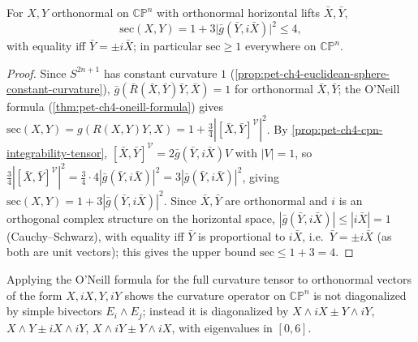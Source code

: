 \begin{theorem}
  \label{thm:pet-ch4-cpn-sectional-curvature}
  For $X,Y$ orthonormal on $\mathbb{CP}^n$ with orthonormal horizontal lifts
  $\bar X,\bar Y$,
  \[
    \mathrm{sec}(X,Y)=1+3\big|\bar g(\bar Y,i\bar X)\big|^2\le4,
  \]
  with equality iff $\bar Y=\pm i\bar X$; in particular $\mathrm{sec}\ge1$
  everywhere on $\mathbb{CP}^n$.
\end{theorem}
\begin{proof}
  Since $S^{2n+1}$ has constant curvature $1$
  (\cref{prop:pet-ch4-euclidean-sphere-constant-curvature}),
  $\bar g(\bar R(\bar X,\bar Y)\bar Y,\bar X)=1$ for orthonormal $\bar X,\bar Y$;
  the O'Neill formula (\cref{thm:pet-ch4-oneill-formula}) gives
  $\mathrm{sec}(X,Y)=g(R(X,Y)Y,X)=1+\tfrac34|[\bar X,\bar Y]^{\mathcal V}|^2$.
  By \cref{prop:pet-ch4-cpn-integrability-tensor},
  $[\bar X,\bar Y]^{\mathcal V}=2\bar g(\bar Y,i\bar X)V$ with $|V|=1$, so
  $\tfrac34|[\bar X,\bar Y]^{\mathcal V}|^2=\tfrac34\cdot4|\bar g(\bar Y,i\bar X)|^2=3|\bar g(\bar Y,i\bar X)|^2$,
  giving $\mathrm{sec}(X,Y)=1+3|\bar g(\bar Y,i\bar X)|^2$. Since $\bar X,\bar Y$
  are orthonormal and $i$ is an orthogonal complex structure on the horizontal
  space, $|\bar g(\bar Y,i\bar X)|\le|i\bar X|=1$ (Cauchy--Schwarz), with
  equality iff $\bar Y$ is proportional to $i\bar X$, i.e.\ $\bar Y=\pm i\bar X$
  (as both are unit vectors); this gives the upper bound $\mathrm{sec}\le1+3=4$.
\end{proof}

\begin{remark}
  \label{rem:pet-ch4-cpn-curvature-operator-eigenbasis}
  Applying the O'Neill formula for the full curvature tensor to orthonormal
  vectors of the form $X,iX,Y,iY$ shows the curvature operator on $\mathbb{CP}^n$
  is not diagonalized by simple bivectors $E_i\wedge E_j$; instead it is
  diagonalized by
  $X\wedge iX\pm Y\wedge iY$, $X\wedge Y\pm iX\wedge iY$, $X\wedge iY\pm Y\wedge iX$,
  with eigenvalues in $[0,6]$.
\end{remark}

